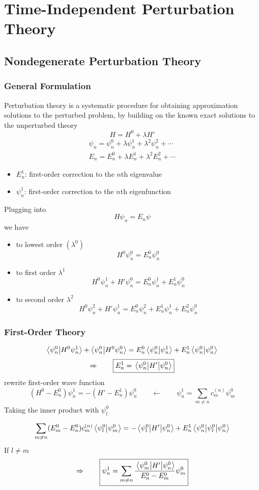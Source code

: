 \chapter{Time-Independent Perturbation Theory}
\section{Nondegenerate Perturbation Theory}
\subsection{General Formulation}
Perturbation theory is a systematic procedure for obtaining approximation solutions to the
perturbed problem, by building on the known exact solutions to the unperturbed theory
\[H=H^0+\lambda H'\]
\[\begin{aligned}
    \psi_n = \psi_n^0 +\lambda\psi_n^1+\lambda^2\psi_n^2+\cdots \\
    E_n=E_n^0 + \lambda E_n^1 + \lambda^2 E_n^2+\cdots
\end{aligned}\]
\begin{itemize}
    \item \(E_n^1\): first-order correction to the \(n\)th eigenvalue
    \item \(\psi_n^1\): first-order correction to the \(n\)th eigenfunction
\end{itemize}
Plugging into
\[H\psi_n=E_n\psi\]
we have
\begin{itemize}
    \item to lowest order \((\lambda^0)\) 
    \[H^0\psi_n^0=E_n^0\psi_n^0\]
    \item to first order \(\lambda^1\)
    \[H^0\psi_n^1+H'\psi_n^0 = E_n^0\psi_n^1+ E_n^1\psi_n^0\]
    \item to second order \(\lambda^2\)
    \[H^0\psi_n^2+H'\psi_n^1 = E_n^0\psi_n^2 + E_n^1\psi_n^1 + E_n^2\psi_n^0\]
\end{itemize}
\subsection{First-Order Theory}
\[\braket{\psi_n^0}{H^0\psi_n^1}+\braket{\psi_n^0}{H^0\psi_n^0} = E_n^0\braket{\psi_n^0}{\psi_n^1}+E_n^1\braket{\psi_n^0}{\psi_n^0}\]
\[\Rightarrow\qquad\boxed{ E_n^1 = \expval{H'}{\psi_n^0} }\]
rewrite first-order wave function
\[(H^0-E_n^0)\psi_n^1 = -(H'-E_n^1)\psi_n^0 \qquad\leftarrow\qquad \psi_n^1=\sum_{m\neq n}c_m^{(n)}\psi_m^0\]
Taking the inner product with \(\psi_l^0\)

\[\sum_{m\neq n} (E_m^0-E_n^0)c_m^{(n)}\braket{\psi_l^0}{\psi_m^0}
   = -\matrixel{\psi_l^0}{H'}{\psi_n^0} + E_n^1\expval{\psi_l^0}{\psi_n^0} \]
If \(l\neq m\)
\[\Rightarrow \qquad \boxed{\psi_n^1 = \sum_{m\neq n}\frac{\matrixel{\psi_m^0}{H'}{\psi_n^0}}{E_n^0 - E_m^0 }\psi_m^0 }\]
